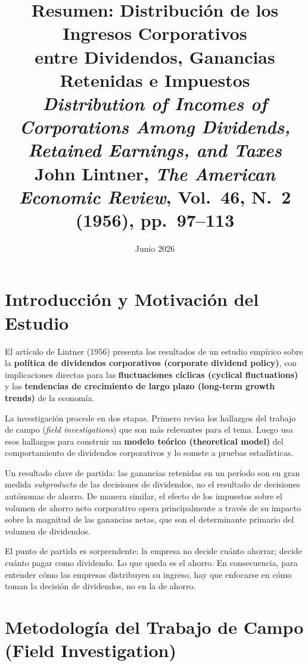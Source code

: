 \documentclass[12pt]{article}
\title{\textbf{Resumen: Distribuci\'on de los Ingresos Corporativos\\
entre Dividendos, Ganancias Retenidas e Impuestos}\\[4pt]
\large \textit{Distribution of Incomes of Corporations Among Dividends,}\\
\textit{Retained Earnings, and Taxes}\\[4pt]
\normalsize John Lintner, \textit{The American Economic Review}, Vol.~46, N.\textdegree~2 (1956), pp.~97--113}
\author{}
\date{Junio 2026}
\begin{document}
\maketitle
\tableofcontents
\newpage

\section{Introducci\'on y Motivaci\'on del Estudio}

El art\'iculo de Lintner (1956) presenta los resultados de un estudio emp\'irico sobre la
\textbf{pol\'itica de dividendos corporativos (corporate dividend policy)}, con implicaciones
directas para las \textbf{fluctuaciones c\'iclicas (cyclical fluctuations)} y las
\textbf{tendencias de crecimiento de largo plazo (long-term growth trends)} de la econom\'ia.

La investigaci\'on procede en dos etapas. Primero revisa los hallazgos del trabajo de campo
(\textit{field investigations}) que son m\'as relevantes para el tema. Luego usa esos hallazgos
para construir un \textbf{modelo te\'orico (theoretical model)} del comportamiento de dividendos
corporativos y lo somete a pruebas estad\'isticas.

Un resultado clave de partida: las ganancias retenidas en un per\'iodo son en gran medida
\textit{subproducto} de las decisiones de dividendos, no el resultado de decisiones aut\'onomas
de ahorro. De manera similar, el efecto de los impuestos sobre el volumen de ahorro neto
corporativo opera principalmente a trav\'es de su impacto sobre la magnitud de las ganancias
netas, que son el determinante primario del volumen de dividendos.

\begin{intuicion}
El punto de partida es sorprendente: la empresa no decide cu\'anto ahorrar; decide
cu\'anto pagar como dividendo. Lo que queda es el ahorro. En consecuencia, para entender
c\'omo las empresas distribuyen su ingreso, hay que enfocarse en c\'omo toman la decisi\'on
de dividendos, no en la de ahorro.
\end{intuicion}

\section{Metodolog\'ia del Trabajo de Campo (Field Investigation)}
\end{document}
